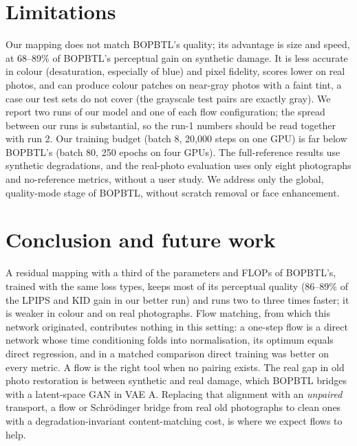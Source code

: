 \documentclass[10pt,twocolumn,letterpaper]{article}
\begin{document}
\section{Limitations}
\label{sec:limits}
Our mapping does not match BOPBTL's quality; its advantage is size and speed, at 68--89\% of BOPBTL's perceptual gain on
synthetic damage. It is less accurate in colour (desaturation, especially of blue) and pixel fidelity, scores lower on
real photos, and can produce colour patches on near-gray photos with a faint tint, a case our test sets do not cover
(the grayscale test pairs are exactly gray). We report two runs of our model and one of each flow configuration; the
spread between our runs is substantial, so the run-1 numbers should be read together with run 2. Our training budget
(batch 8, 20{,}000 steps on one GPU) is far below BOPBTL's (batch 80, 250 epochs on four GPUs). The full-reference
results use synthetic degradations, and the real-photo evaluation uses only eight photographs and no-reference metrics,
without a user study. We address only the global, quality-mode stage of BOPBTL, without scratch removal or face
enhancement.

\section{Conclusion and future work}
A residual mapping with a third of the parameters and FLOPs of BOPBTL's, trained with the same loss types, keeps most of
its perceptual quality (86--89\% of the LPIPS and KID gain in our better run) and runs two to three times faster; it is
weaker in colour and on real photographs. Flow matching, from which this network originated, contributes nothing in
this setting: a one-step flow is a direct network whose time conditioning folds into normalisation, its optimum equals
direct regression, and in a matched comparison direct training was better on every metric. A flow is the right tool
when no pairing exists. The real gap in old photo restoration is between synthetic and real damage, which BOPBTL bridges
with a latent-space GAN in VAE A. Replacing that alignment with an \emph{unpaired} transport, a flow or Schrödinger
bridge from real old photographs to clean ones with a degradation-invariant content-matching cost, is where we expect
flows to help.

{\small


}
\end{document}
